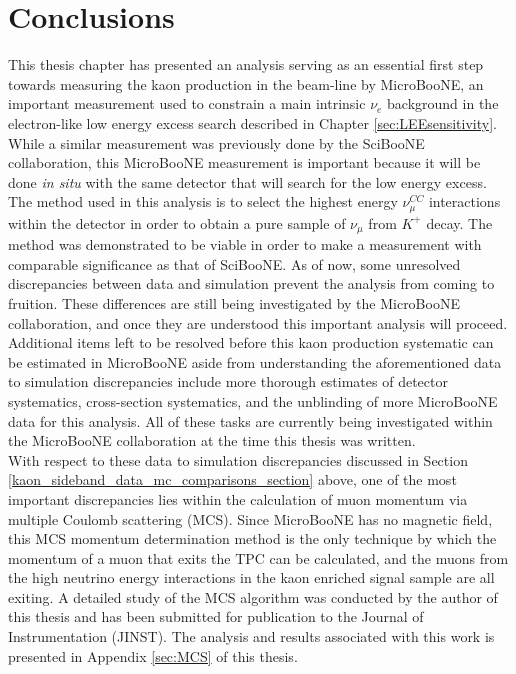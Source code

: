 \section{Conclusions}
This thesis chapter has presented an analysis serving as an essential first step towards measuring the kaon production in the beam-line by MicroBooNE, an important measurement used to constrain a main intrinsic $\nu_e$ background in the electron-like low energy excess search described in Chapter \ref{sec:LEEsensitivity}. While a similar measurement was previously done by the SciBooNE collaboration, this MicroBooNE measurement is important because it will be done \textit{in situ} with the same detector that will search for the low energy excess. The method used in this analysis is to select the highest energy $\nu_\mu^{CC}$ interactions within the detector in order to obtain a pure sample of $\nu_\mu$ from $K^+$ decay. The method was demonstrated to be viable in order to make a measurement with comparable significance as that of SciBooNE. As of now, some unresolved discrepancies between data and simulation prevent the analysis from coming to fruition. These differences are still being investigated by the MicroBooNE collaboration, and once they are understood this important analysis will proceed. Additional items left to be resolved before this kaon production systematic can be estimated in MicroBooNE aside from understanding the aforementioned data to simulation discrepancies include more thorough estimates of detector systematics, cross-section systematics, and the unblinding of more MicroBooNE data for this analysis. All of these tasks are currently being investigated within the MicroBooNE collaboration at the time this thesis was written.\\

With respect to these data to simulation discrepancies discussed in Section \ref{kaon_sideband_data_mc_comparisons_section} above, one of the most important discrepancies lies within the calculation of muon momentum via multiple Coulomb scattering (MCS). Since MicroBooNE has no magnetic field, this MCS momentum determination method is the only technique by which the momentum of a muon that exits the TPC can be calculated, and the muons from the high neutrino energy interactions in the kaon enriched signal sample are all exiting. A detailed study of the MCS algorithm was conducted by the author of this thesis and has been submitted for publication to the Journal of Instrumentation (JINST). The analysis and results associated with this work is presented in Appendix \ref{sec:MCS} of this thesis. 